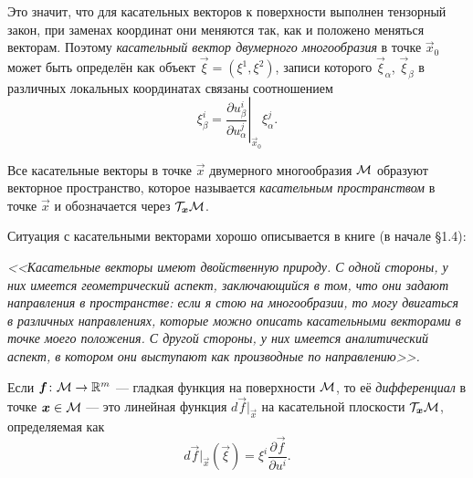 Это значит, что для касательных векторов к поверхности выполнен тензорный закон, при заменах координат они меняются так, как и положено меняться векторам. Поэтому \textit{касательный вектор двумерного многообразия} в точке $\vec{x}_0$ может быть определён как объект $\vec{\xi} = (\xi^1, \xi^2)$, записи которого $\vec{\xi}_\alpha$, $\vec{\xi}_\beta$ в различных локальных координатах связаны соотношением
\[
	\xi_\beta^i = \left.\frac{\partial u_\beta^i}{\partial u_\alpha^j}\right|_{\vec{x}_0}\xi^j_\alpha.
\]

\begin{definition}
	Все касательные векторы в точке $\vec{x}$ двумерного многообразия $\mathcal{M}$ образуют векторное пространство, которое называется \textit{касательным пространством} в точке $\vec{x}$ и обозначается через $\mathcal{T}_{\boldsymbol{x}}\mathcal{M}$.
\end{definition}

\noindent
Ситуация с касательными векторами хорошо описывается в книге \cite{S19} (в начале \S 1{.}4):

\begin{center}
	\begin{minipage}{.9\textwidth} \centering
		\textit{<<Касательные векторы имеют двойственную природу. С одной стороны, у них имеется геометрический аспект, заключающийся в том, что они задают направления в пространстве: если я стою на многообразии, то могу двигаться в различных направлениях, которые можно описать касательными векторами в точке моего положения. С другой стороны, у них имеется аналитический аспект, в котором они выступают как \glqq производные по направлению\grqq>>.}
	\end{minipage}
\end{center}

%
\begin{definition}
	Если $\boldsymbol{f}\colon\mathcal{M} \to \mathbb{R}^m$ --- гладкая функция на поверхности $\mathcal{M}$, то её \textit{дифференциал} в точке $\boldsymbol{x} \in \mathcal{M}$ --- это линейная функция $d\vec{f}|_{\vec{x}}$ на касательной плоскости $\mathcal{T}_{\boldsymbol{x}}\mathcal{M}$, определяемая как
	\[
		d\vec{f}|_{\vec{x}}(\vec{\xi}) = \xi^i\frac{\partial \vec{f}}{\partial u^i}.
	\]
\end{definition}

